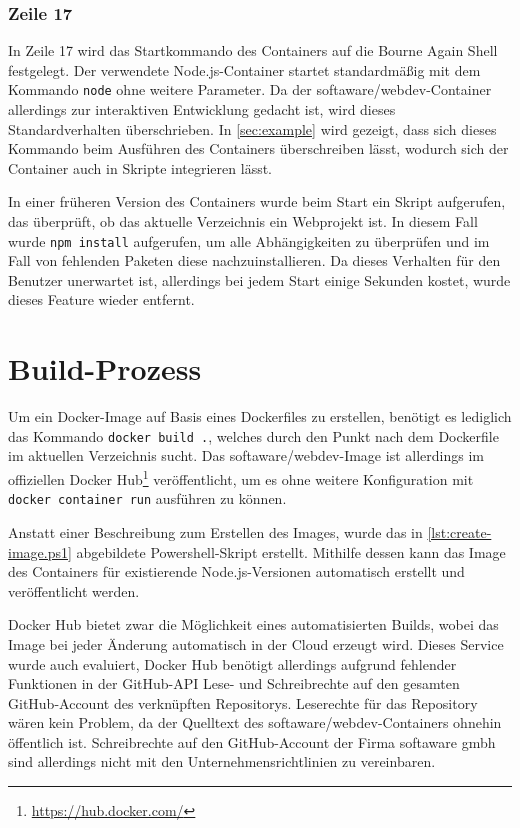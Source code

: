 \subsubsection {Zeile 17}
In Zeile 17 wird das Startkommando des Containers auf die Bourne Again Shell festgelegt.
Der verwendete Node.js-Container startet standardmäßig mit dem Kommando \verb|node| ohne weitere Parameter.
Da der softaware/webdev-Container allerdings zur interaktiven Entwicklung gedacht ist, wird dieses Standardverhalten überschrieben.
In \cref{sec:example} wird gezeigt, dass sich dieses Kommando beim Ausführen des Containers überschreiben lässt, wodurch sich der Container auch in Skripte integrieren lässt.

In einer früheren Version des Containers wurde beim Start ein Skript aufgerufen, das überprüft, ob das aktuelle Verzeichnis ein Webprojekt ist.
In diesem Fall wurde \verb|npm install| aufgerufen, um alle Abhängigkeiten zu überprüfen und im Fall von fehlenden Paketen diese nachzuinstallieren.
Da dieses Verhalten für den Benutzer unerwartet ist, allerdings bei jedem Start einige Sekunden kostet, wurde dieses Feature wieder entfernt. 


\section{Build-Prozess}
\label{sec:build-process}
Um ein Docker-Image auf Basis eines Dockerfiles zu erstellen, benötigt es lediglich das Kommando \verb|docker build .|, welches durch den Punkt nach dem Dockerfile im aktuellen Verzeichnis sucht.
Das softaware/webdev-Image ist allerdings im offiziellen Docker Hub\footnote{\url{https://hub.docker.com/}} veröffentlicht, um es ohne weitere Konfiguration mit \verb|docker container run| ausführen zu können.

Anstatt einer Beschreibung zum Erstellen des Images, wurde das in \cref{lst:create-image.ps1} abgebildete Powershell-Skript erstellt.
Mithilfe dessen kann das Image des Containers für existierende Node.js-Versionen automatisch erstellt und veröffentlicht werden.

Docker Hub bietet zwar die Möglichkeit eines automatisierten Builds, wobei das Image bei jeder Änderung automatisch in der Cloud erzeugt wird.
Dieses Service wurde auch evaluiert, Docker Hub benötigt allerdings aufgrund fehlender Funktionen in der GitHub-API Lese- und Schreibrechte auf den gesamten GitHub-Account des verknüpften Repositorys.
Leserechte für das Repository wären kein Problem, da der Quelltext des softaware/webdev-Containers ohnehin öffentlich ist.
Schreibrechte auf den GitHub-Account der Firma softaware gmbh sind allerdings nicht mit den Unternehmensrichtlinien zu vereinbaren.


